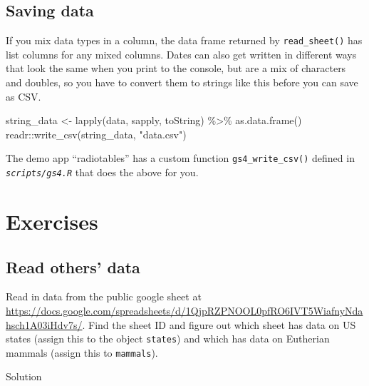 \documentclass[
  oneside]{book}
\newenvironment{Shaded}{\begin{snugshade}}{\end{snugshade}}
\newcommand{\FunctionTok}[1]{\textcolor[rgb]{0.00,0.00,0.00}{#1}}
\newcommand{\NormalTok}[1]{#1}
\newcommand{\OtherTok}[1]{\textcolor[rgb]{0.56,0.35,0.01}{#1}}
\newcommand{\SpecialCharTok}[1]{\textcolor[rgb]{0.00,0.00,0.00}{#1}}
\newcommand{\StringTok}[1]{\textcolor[rgb]{0.31,0.60,0.02}{#1}}
\begin{document}
\hypertarget{gs4_save}{%
\subsection{Saving data}\label{gs4_save}}

If you mix data types in a column, the data frame returned by \texttt{read\_sheet}\texttt{()} has list columns for any mixed columns. Dates can also get written in different ways that look the same when you print to the console, but are a mix of characters and doubles, so you have to convert them to strings like this before you can save as CSV.

\begin{Shaded}
\begin{Highlighting}[]
\NormalTok{string\_data }\OtherTok{\textless{}{-}} \FunctionTok{lapply}\NormalTok{(data, sapply, toString) }\SpecialCharTok{\%\textgreater{}\%} \FunctionTok{as.data.frame}\NormalTok{()}
\NormalTok{readr}\SpecialCharTok{::}\FunctionTok{write\_csv}\NormalTok{(string\_data, }\StringTok{"data.csv"}\NormalTok{)}
\end{Highlighting}
\end{Shaded}

The demo app ``radiotables'' has a custom function \texttt{gs4\_write\_csv}\texttt{()} defined in \textit{\texttt{scripts/gs4.R}} that does the above for you.

\hypertarget{exercises-data}{%
\section{Exercises}\label{exercises-data}}

\hypertarget{read-others-data}{%
\subsection*{Read others' data}\label{read-others-data}}

Read in data from the public google sheet at \url{https://docs.google.com/spreadsheets/d/1QjpRZPNOOL0pfRO6IVT5WiafnyNdahsch1A03iHdv7s/}. Find the sheet ID and figure out which sheet has data on US states (assign this to the object \texttt{states}) and which has data on Eutherian mammals (assign this to \texttt{mammals}).

Solution
\end{document}
